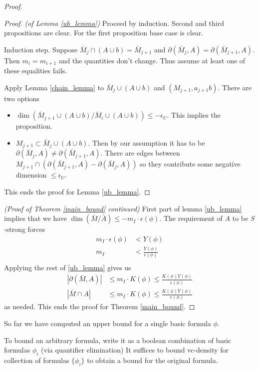 \documentclass{amsart}
\begin{document}
\begin{proof}
	\begin{proof} \textit{(of Lemma \ref{ub_lemma})}
		Proceed by induction.
		Second and third propositions are clear.
		For the first proposition base case is clear.
		
		Induction step.
		Suppose $\bar M_j \cap (A \cup b) = \bar M_{j+1}$ and $\partial(\bar M_j, A) = \partial(\bar M_{j+1}, A)$.
		Then $m_i = m_{i+1}$ and the quantities don't change.
		Thus assume at least one of these equalities fails.
		
		Apply Lemma \ref{chain_lemma} to $\bar M_j \cup (A \cup b)$ and $(M_{j+1}, a_{j+1}b)$.
		There are two options
		
		\begin{itemize}
			\item $\dim(\bar M_{j+1} \cup (A \cup b) / \bar M_i \cup (A \cup b)) \leq -\epsilon_U$.
			This implies the proposition.
			\item $M_{j+1} \subset \bar M_j \cup (A \cup b)$.
			Then by our assumption it has to be $\partial(\bar M_j, A) \neq \partial(\bar M_{j+1}, A)$.
			There are edges between $M_{j+1} \cap (\partial(\bar M_{j+1}, A) - \partial(\bar M_j, A))$ so they contribute some negative dimension $\leq \epsilon_U$.
		\end{itemize}
		This ends the proof for Lemma \ref{ub_lemma}.
	\end{proof}
	\textit{(Proof of Theorem \ref{main_bound} continued)}
	First part of lemma \ref{ub_lemma} implies that we have $\dim(\bar M / \bar A) \leq -m_I \cdot \epsilon(\phi)$.
	The requirement of $A$ to be $S$-strong forces
	\begin{align*}
		m_I \cdot \epsilon(\phi) &< Y(\phi) \\
		m_I  &< \frac{Y(\phi)}{\epsilon(\phi)} \\
	\end{align*}
	Applying the rest of \ref{ub_lemma} gives us
	\begin{align*}
		|\partial(\bar M, A)| &\leq m_I \cdot K(\phi) \leq \frac{K(\phi)Y(\phi)}{\epsilon(\phi)} \\
		|\bar M \cap A| &\leq m_I \cdot K(\phi) \leq \frac{K(\phi)Y(\phi)}{\epsilon(\phi)}
	\end{align*}
	as needed.
	This ends the proof for Theorem \ref{main_bound}.
\end{proof}

So far we have computed an upper bound for a single basic formula $\phi$.

To bound an arbitrary formula, write it as a boolean combination of basic formulas $\phi_i$ (via quantifier elimination)
It suffices to bound vc-density for collection of formulas $\{\phi_i\}$ to obtain a bound for the original formula.
\end{document}
